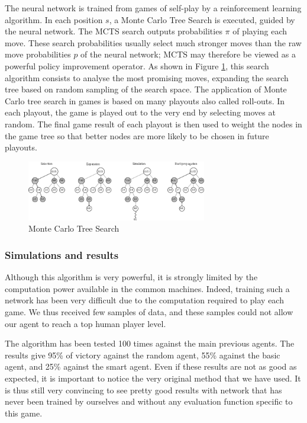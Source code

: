 \documentclass[journal,onecolumn]{IEEEtran}
\begin{document}
The neural network is trained from games of self-play by a reinforcement learning algorithm. In each position $s$, a Monte Carlo Tree Search is executed, guided by the neural network. The MCTS search outputs probabilities \(\pi\) of playing each move. These search probabilities usually select much stronger moves than the raw move probabilities $p$ of the neural network; MCTS may therefore be viewed as a powerful policy improvement operator. As shown in Figure \ref{fig:mcts}, this search algorithm consists to analyse the most promising moves, expanding the search tree based on random sampling of the search space. The application of Monte Carlo tree search in games is based on many playouts also called roll-outs. In each playout, the game is played out to the very end by selecting moves at random. The final game result of each playout is then used to weight the nodes in the game tree so that better nodes are more likely to be chosen in future playouts.

\begin{figure}[H]
    \centering
    \includegraphics[width=0.7\textwidth]{img/mcts.png}
    \caption{Monte Carlo Tree Search}
    \label{fig:mcts}
\end{figure}

\subsubsection*{Simulations and results}

Although this algorithm is very powerful, it is strongly limited by the computation power available in the common machines. Indeed, training such a network has been very difficult due to the computation required to play each game. We thus received few samples of data, and these samples could not allow our agent to reach a top human player level.

The algorithm has been tested 100 times against the main previous agents. The results give 95\% of victory against the random agent, 55\% against the basic agent, and 25\% against the smart agent. Even if these results are not as good as expected, it is important to notice the very original method that we have used. It is thus still very convincing to see pretty good results with network that has never been trained by ourselves and without any evaluation function specific to this game.

%

\end{document}
